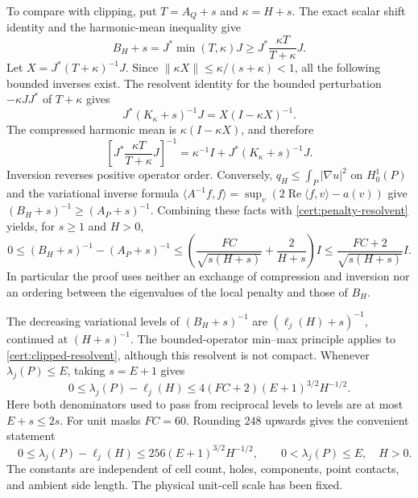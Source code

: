 \documentclass[11pt,reqno]{amsart}
\numberwithin{equation}{section}
\newcommand{\norm}[1]{\lVert#1\rVert}
\begin{document}
To compare with clipping, put $T=A_Q+s$ and $\kappa=H+s$.
The exact scalar shift identity and the harmonic-mean inequality
give
\[
 B_H+s=J^*\min(T,\kappa)J
       \ge J^*\frac{\kappa T}{T+\kappa}J.
\]
Let $X=J^*(T+\kappa)^{-1}J$.  Since
$\norm{\kappa X}\le\kappa/(s+\kappa)<1$, all the following
bounded inverses exist.  The resolvent identity for the bounded
perturbation $-\kappa JJ^*$ of $T+\kappa$ gives
\[
 J^*(K_\kappa+s)^{-1}J=X(I-\kappa X)^{-1}.
\]
The compressed harmonic mean is $\kappa(I-\kappa X)$, and
therefore
\begin{equation}\label{cert:harmonic-identity}
 \left[J^*\frac{\kappa T}{T+\kappa}J\right]^{-1}
 =\kappa^{-1}I+J^*(K_\kappa+s)^{-1}J .
\end{equation}
Inversion reverses positive operator order.  Conversely,
$q_H\le\int_P|\nabla u|^2$ on $H^1_0(P)$ and the variational
inverse formula
$\langle A^{-1}f,f\rangle
 =\sup_v(2\operatorname{Re}\langle f,v\rangle-a(v))$
give $(B_H+s)^{-1}\ge(A_P+s)^{-1}$.  Combining these facts with
\eqref{cert:penalty-resolvent} yields, for $s\ge1$ and $H>0$,
\begin{equation}\label{cert:clipped-resolvent}
 0\le(B_H+s)^{-1}-(A_P+s)^{-1}
 \le\left(\frac{FC}{\sqrt{s(H+s)}}+\frac2{H+s}\right)I
 \le\frac{FC+2}{\sqrt{s(H+s)}}I .
\end{equation}
In particular the proof uses neither an exchange of compression
and inversion nor an ordering between the eigenvalues of the
local penalty and those of $B_H$.

The decreasing variational levels of $(B_H+s)^{-1}$ are
$(\ell_j(H)+s)^{-1}$, continued at $(H+s)^{-1}$.
The bounded-operator min--max principle applies to
\eqref{cert:clipped-resolvent}, although this resolvent is not
compact.  Whenever $\lambda_j(P)\le E$, taking $s=E+1$ gives
\begin{equation}\label{cert:general-gap}
 0\le\lambda_j(P)-\ell_j(H)
 \le4(FC+2)(E+1)^{3/2}H^{-1/2}.
\end{equation}
Here both denominators used to pass from reciprocal levels to
levels are at most $E+s\le2s$.  For unit masks $FC=60$.
Rounding $248$ upwards gives the convenient statement
\begin{equation}\label{cert:mask-rate}
 \boxed{\quad
 0\le\lambda_j(P)-\ell_j(H)
 \le256(E+1)^{3/2}H^{-1/2},
 \qquad 0<\lambda_j(P)\le E,\quad H>0 .
 \quad}
\end{equation}
The constants are independent of cell count, holes, components,
point contacts, and ambient side length.  The physical unit-cell
scale has been fixed.
\end{document}
